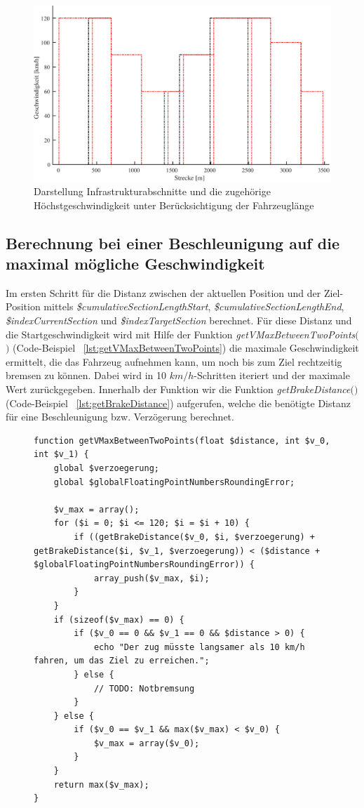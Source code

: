 \begin{figure}
  \includegraphics[width=\linewidth]{../matlab/it2.pdf}
  \caption{Darstellung Infrastrukturabschnitte und die zugehörige Höchstgeschwindigkeit unter Berücksichtigung der Fahrzeuglänge}
  \label{fig:it2}
\end{figure}

\subsection{Berechnung bei einer Beschleunigung auf die maximal mögliche Geschwindigkeit} \label{v_max}

Im ersten Schritt für die Distanz zwischen der aktuellen Position und der Ziel-Position mittels \textit{\$cumulativeSectionLengthStart}, \textit{\$cumulativeSectionLengthEnd}, \textit{\$indexCurrentSection} und \textit{\$indexTargetSection} berechnet. Für diese Distanz und die Startgeschwindigkeit wird mit Hilfe der Funktion \textit{getVMaxBetweenTwoPoints$($$)$} (Code-Beispiel ~\ref{lst:getVMaxBetweenTwoPoints}) die maximale Geschwindigkeit ermittelt, die das Fahrzeug aufnehmen kann, um noch bis zum Ziel rechtzeitig bremsen zu können. Dabei wird in 10 $km/h$-Schritten iteriert und der maximale Wert zurückgegeben. Innerhalb der Funktion wir die Funktion \textit{getBrakeDistance$($$)$} (Code-Beispiel ~\ref{lst:getBrakeDistance}) aufgerufen, welche die benötigte Distanz für eine Beschleunigung bzw. Verzögerung berechnet. 

\begin{figure}
\begin{lstlisting}[caption={\textit{getVMaxBetweenTwoPoints$($$)$}},captionpos=b,label={lst:getVMaxBetweenTwoPoints}]
function getVMaxBetweenTwoPoints(float $distance, int $v_0, int $v_1) {
	global $verzoegerung;
	global $globalFloatingPointNumbersRoundingError;

	$v_max = array();
	for ($i = 0; $i <= 120; $i = $i + 10) {
		if ((getBrakeDistance($v_0, $i, $verzoegerung) + getBrakeDistance($i, $v_1, $verzoegerung)) < ($distance + $globalFloatingPointNumbersRoundingError)) {
			array_push($v_max, $i);
		}
	}
	if (sizeof($v_max) == 0) {
		if ($v_0 == 0 && $v_1 == 0 && $distance > 0) {
			echo "Der zug müsste langsamer als 10 km/h fahren, um das Ziel zu erreichen.";
		} else {
			// TODO: Notbremsung
		}
	} else {
		if ($v_0 == $v_1 && max($v_max) < $v_0) {
			$v_max = array($v_0);
		}
	}
	return max($v_max);
}
\end{lstlisting}
\end{figure}

